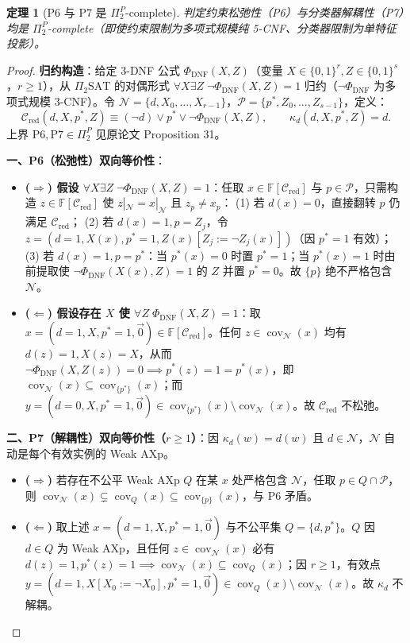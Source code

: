 \documentclass[11pt,a4paper]{article}
\newtheorem{theorem}{定理}[section]
\newcommand{\F}{\mathbb{F}}
\newcommand{\C}{\mathcal{C}}
\newcommand{\N}{\mathcal{N}}
\newcommand{\Prot}{\mathcal{P}}
\newcommand{\cov}{\operatorname{cov}}
\begin{document}
\begin{theorem}[P6 与 P7 是 $\Pi_2^P$-complete]
判定约束松弛性（P6）与分类器解耦性（P7）均是 $\Pi_2^P$-complete（即使约束限制为多项式规模纯 5-CNF、分类器限制为单特征投影）。
\end{theorem}
\begin{proof}
\textbf{归约构造}：给定 3-DNF 公式 $\Phi_{\mathrm{DNF}}(X, Z)$（变量 $X \in \{0,1\}^r, Z \in \{0,1\}^s$，$r \ge 1$），从 $\Pi_2\text{SAT}$ 的对偶形式 $\forall X\exists Z\;\neg\Phi_{\mathrm{DNF}}(X,Z)=1$ 归约（$\neg\Phi_{\mathrm{DNF}}$ 为多项式规模 3-CNF）。令 $\N = \{d, X_0, \dots, X_{r-1}\}$，$\Prot = \{p^*, Z_0, \dots, Z_{s-1}\}$，定义：
\[
  \C_{\mathrm{red}}(d, X, p^*, Z) \equiv (\neg d) \lor p^* \lor \neg\Phi_{\mathrm{DNF}}(X, Z), \qquad \kappa_d(d, X, p^*, Z) = d.
\]
上界 $\mathrm{P6, P7} \in \Pi_2^P$ 见原论文 Proposition 31。

\textbf{一、P6（松弛性）双向等价性}：
\begin{itemize}
  \item \textbf{($\Rightarrow$) 假设 $\forall X\exists Z\;\neg\Phi_{\mathrm{DNF}}(X,Z)=1$}：任取 $x \in \F[\C_{\mathrm{red}}]$ 与 $p \in \Prot$，只需构造 $z \in \F[\C_{\mathrm{red}}]$ 使 $z|_{\N}=x|_{\N}$ 且 $z_p \ne x_p$：
  (1) 若 $d(x)=0$，直接翻转 $p$ 仍满足 $\C_{\mathrm{red}}$；
  (2) 若 $d(x)=1, p=Z_j$，令 $z=(d=1, X(x), p^*=1, Z(x)[Z_j:=\neg Z_j(x)])$（因 $p^*=1$ 有效）；
  (3) 若 $d(x)=1, p=p^*$：当 $p^*(x)=0$ 时置 $p^*=1$；当 $p^*(x)=1$ 时由前提取使 $\neg\Phi_{\mathrm{DNF}}(X(x), Z)=1$ 的 $Z$ 并置 $p^*=0$。故 $\{p\}$ 绝不严格包含 $\N$。
  \item \textbf{($\Leftarrow$) 假设存在 $X$ 使 $\forall Z\;\Phi_{\mathrm{DNF}}(X,Z)=1$}：取 $x = (d=1, X, p^*=1, \vec{0}) \in \F[\C_{\mathrm{red}}]$。任何 $z \in \cov_{\N}(x)$ 均有 $d(z)=1, X(z)=X$，从而 $\neg\Phi_{\mathrm{DNF}}(X,Z(z))=0 \implies p^*(z)=1=p^*(x)$，即 $\cov_{\N}(x) \subseteq \cov_{\{p^*\}}(x)$；而 $y=(d=0, X, p^*=1, \vec{0}) \in \cov_{\{p^*\}}(x) \setminus \cov_{\N}(x)$。故 $\C_{\mathrm{red}}$ 不松弛。
\end{itemize}

\textbf{二、P7（解耦性）双向等价性（$r \ge 1$）}：因 $\kappa_d(w)=d(w)$ 且 $d \in \N$，$\N$ 自动是每个有效实例的 Weak AXp。
\begin{itemize}
  \item \textbf{($\Rightarrow$)} 若存在不公平 Weak AXp $Q$ 在某 $x$ 处严格包含 $\N$，任取 $p \in Q \cap \Prot$，则 $\cov_{\N}(x) \subsetneq \cov_Q(x) \subseteq \cov_{\{p\}}(x)$，与 P6 矛盾。
  \item \textbf{($\Leftarrow$)} 取上述 $x=(d=1, X, p^*=1, \vec{0})$ 与不公平集 $Q=\{d, p^*\}$。$Q$ 因 $d \in Q$ 为 Weak AXp，且任何 $z \in \cov_{\N}(x)$ 必有 $d(z)=1, p^*(z)=1 \implies \cov_{\N}(x) \subseteq \cov_Q(x)$；因 $r \ge 1$，有效点 $y=(d=1, X[X_0:=\neg X_0], p^*=1, \vec{0}) \in \cov_Q(x) \setminus \cov_{\N}(x)$。故 $\kappa_d$ 不解耦。
\end{itemize}
\end{proof}
\end{document}
